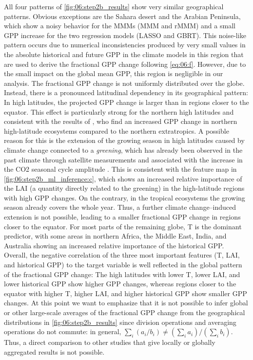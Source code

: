 All four patterns of \cref{fig:06:step2b_results} show very similar
geographical patterns. Obvious exceptions are the Sahara desert and the Arabian
Peninsula, which show a noisy behavior for the \aclp{MMM} (\ac{MMM} and
r\acs{MMM}) and a small \ac{GPP} increase for the two regression models
(\ac{LASSO} and \ac{GBRT}). This noise-like pattern occurs due to numerical
inconsistencies produced by very small values in the absolute historical and
future \ac{GPP} in the climate models in this region that are used to derive
the fractional \ac{GPP} change following \cref{eq:06:f}. However, due to the
small impact on the global mean \ac{GPP}, this region is negligible in our
analysis. The fractional \ac{GPP} change is not uniformly distributed over the
globe. Instead, there is a pronounced latitudinal dependency in its
geographical pattern: In high latitudes, the projected \ac{GPP} change is
larger than in regions closer to the equator. This effect is particularly
strong for the northern high latitudes and consistent with the results of
\textcite{Wenzel2016}, who find an increased \ac{GPP} change in northern
high-latitude ecosystems compared to the northern extratropics. A possible
reason for this is the extension of the growing season in high latitudes caused
by climate change connected to a \emph{greening}, which has already been
observed in the past climate through satellite measurements
\autocite{Lucht2002, Myneni1997, Zhang2020} and associated with the increase in
the \ac{CO2} seasonal cycle amplitude \autocite{Forkel2016}. This is consistent
with the feature map in \cref{fig:06:step2b_ml_inference:c}, which shows an
increased relative importance of the \ac{LAI} (a quantity directly related to
the greening) in the high-latitude regions with high \ac{GPP} changes. On the
contrary, in the tropical ecosystems the growing season already covers the
whole year. Thus, a further climate change--induced extension is not possible,
leading to a smaller fractional \ac{GPP} change in regions closer to the
equator. For most parts of the remaining globe, \ac{T} is the dominant
predictor, with some areas in northern Africa, the Middle East, India, and
Australia showing an increased relative importance of the historical \ac{GPP}.
Overall, the negative correlation of the three most important features (\ac{T},
\ac{LAI}, and historical \ac{GPP}) to the target variable is well reflected in
the global pattern of the fractional \ac{GPP} change: The high latitudes with
lower \ac{T}, lower \ac{LAI}, and lower historical \ac{GPP} show higher
\ac{GPP} changes, whereas regions closer to the equator with higher \ac{T},
higher \ac{LAI}, and higher historical \ac{GPP} show smaller \ac{GPP} changes.
At this point we want to emphasize that it is not possible to infer global or
other large-scale averages of the fractional \ac{GPP} change from the
geographical distributions in \cref{fig:06:step2b_results} since division
operations and averaging operations do not commute: in general, $\sum_i \left(
a_i / b_i \right) \neq \left( \sum_i a_i \right) / \left( \sum_i b_i \right)$.
Thus, a direct comparison to other studies that give locally or globally
aggregated results is not possible.

